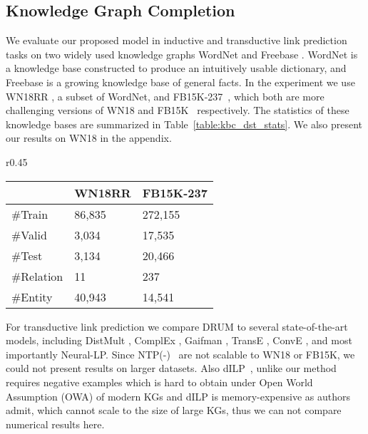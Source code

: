 \documentclass{article}
\begin{document}
\subsection{Knowledge Graph Completion}

We evaluate our proposed model in inductive and transductive link prediction tasks on two widely used knowledge graphs WordNet \citep{kilgarriff2000wordnet, miller1995wordnet} and Freebase \citep{bollacker2008freebase}. WordNet is a knowledge base constructed to produce an intuitively usable dictionary, and Freebase is a growing knowledge base of general facts. In the experiment we use WN18RR \citep{dettmers2018convolutional}, a subset of WordNet, and FB15K-237~\citep{toutanova2015observed}, which both are more challenging versions of  WN18 and FB15K~\citep{bordes2013translating} respectively. The statistics of these knowledge bases are summarized in Table~\ref{table:kbc_dst_stats}. We also present our results on WN18  \citep{bordes2013translating} in the appendix.

\begin{wraptable}{r}{0.45 \textwidth}
\vspace{-4pt}
\caption{Datasets statistics for Knowledge base completion.}
\label{table:kbc_dst_stats}
\centering
\begin{tabular}{lll}
\toprule
& \textbf{WN18RR} & \textbf{FB15K-237} \\
\midrule
\#Train & 86,835 & 272,155 \\
\#Valid & 3,034 & 17,535 \\
\#Test & 3,134 & 20,466\\
\#Relation & 11 & 237 \\
\#Entity & 40,943 &  14,541 \\
\bottomrule
\end{tabular}
\vspace{-10pt}
\end{wraptable}




For transductive link prediction we compare DRUM to several state-of-the-art models, including DistMult \citep{Yang2015EmbeddingEA}, ComplEx \citep{pmlr-v48-trouillon16}, Gaifman \citep{Niepert:2016:DGM:3157382.3157479}, TransE \citep{bordes2013translating}, ConvE
\citep{dettmers2018convolutional}, and most importantly Neural-LP. Since NTP(-)~\cite{rocktaschel2017end} are not scalable to WN18 or FB15K, we could not present results on larger datasets. Also dILP~\cite{evans2018learning}, unlike our method requires negative examples which is hard to obtain under Open World Assumption (OWA) of modern KGs and dILP is memory-expensive as authors admit, which cannot scale to the size of large KGs, thus we can not compare numerical results here.
\end{document}
